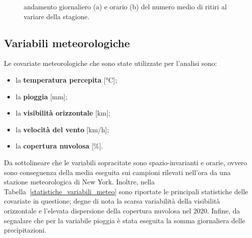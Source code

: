 \begin{figure}[htpb]
	\centering
	\quad
	\quad
	\caption[Andamento giornaliero e orario del numero medio di ritiri al variare della stagione]{andamento giornaliero (a) e orario (b) del numero medio di ritiri al variare della stagione.}
	\label{ritiri_giornalieri_orari}
\end{figure}

\subsection[Variabili meteorologiche]{Variabili meteorologiche}
Le covariate meteorologiche che sono state utilizzate per l'analisi sono:
\begin{itemize}
	\item la \textbf{temperatura percepita}  [\unit{\degreeCelsius}];
	\item la \textbf{pioggia} [\unit{\milli\meter}];
	\item la \textbf{visibilità orizzontale} [\unit{\kilo\meter}];
	\item la \textbf{velocità del vento} [\unit{\kilo\meter/\hour}];
	\item la \textbf{copertura nuvolosa} [\unit{\percent}].
\end{itemize}
Da sottolineare che le variabili sopracitate sono spazio-invarianti e orarie, ovvero sono conseguenza della media eseguita sui campioni rilevati nell'ora da una stazione meteorologica di New York. Inoltre, nella Tabella~\ref{statistiche_variabili_meteo} sono riportate le principali statistiche delle covariate in questione; degne di nota la scarsa variabilità della visibilità orizzontale e l'elevata dispersione della copertura nuvolosa nel \num{2020}. Infine, da segnalare che  per la variabile pioggia è stata eseguita la somma giornaliera delle precipitazioni.

